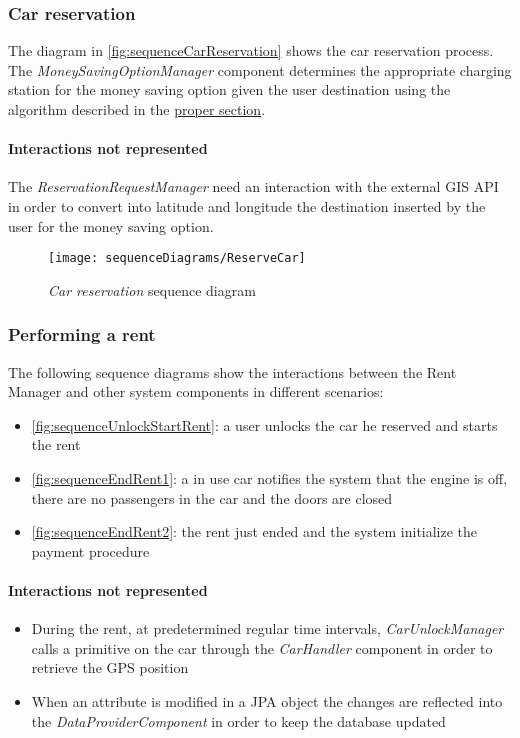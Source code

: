 \clearpage
\subsubsection{Car reservation}
The diagram in \autoref{fig:sequenceCarReservation} shows the car reservation process.\\
The \mbox{\emph{MoneySavingOptionManager}} component determines the appropriate charging station for the money saving option given the user destination using the algorithm described in the \hyperref[sec:msoAlgorithm]{proper section}.

\paragraph{Interactions not represented}The \emph{ReservationRequestManager} need an interaction with the external GIS API in order to convert into latitude and longitude the destination inserted by the user for the money saving option.
\begin{figure}[h!]
	\centering
	\texttt{[image: sequenceDiagrams/ReserveCar]}
	\caption{
		\label{fig:sequenceCarReservation} 
		\emph{Car reservation} sequence diagram
	}
\end{figure}

\clearpage
\subsubsection{Performing a rent}
The following sequence diagrams show the interactions between the \mbox{Rent} \mbox{Manager} and other system components in different scenarios:
\begin{itemize}
	\item \autoref{fig:sequenceUnlockStartRent}: a user unlocks the car he reserved and starts the rent
	\item \autoref{fig:sequenceEndRent1}: a in use car notifies the system that the engine is off, there are no passengers in the car and the doors are closed
	\item \autoref{fig:sequenceEndRent2}: the rent just ended and the system initialize the payment procedure
\end{itemize}

\paragraph{Interactions not represented}
\begin{itemize}
	\item During the rent, at predetermined regular time intervals, \emph{CarUnlockManager} calls a primitive on the car through the \emph{CarHandler} component in order to retrieve the GPS position

	\item When an attribute is modified in a JPA object the changes are reflected into the \emph{DataProviderComponent} in order to keep the database updated
\end{itemize}

